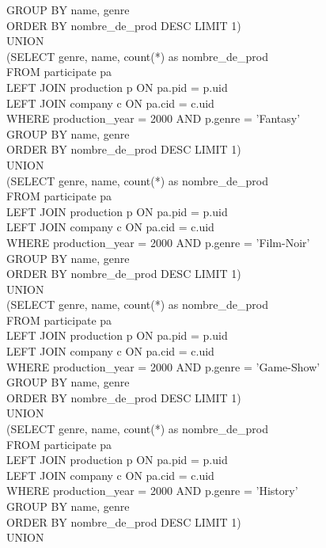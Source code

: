 \documentclass{article}
\begin{document}
GROUP BY name, genre\\
ORDER BY nombre_de_prod DESC LIMIT 1)\\
UNION\\
(SELECT genre, name, count(*) as nombre_de_prod\\
FROM participate pa\\
LEFT JOIN production p ON pa.pid = p.uid\\
LEFT JOIN company c ON pa.cid = c.uid\\
WHERE production_year = 2000 AND p.genre = 'Fantasy'  \\
GROUP BY name, genre\\
ORDER BY nombre_de_prod DESC LIMIT 1)\\
UNION \\
(SELECT genre, name, count(*) as nombre_de_prod\\
FROM participate pa\\
LEFT JOIN production p ON pa.pid = p.uid\\
LEFT JOIN company c ON pa.cid = c.uid\\
WHERE production_year = 2000 AND p.genre = 'Film-Noir'  \\
GROUP BY name, genre\\
ORDER BY nombre_de_prod DESC LIMIT 1)\\
UNION\\
(SELECT genre, name, count(*) as nombre_de_prod\\
FROM participate pa\\
LEFT JOIN production p ON pa.pid = p.uid\\
LEFT JOIN company c ON pa.cid = c.uid\\
WHERE production_year = 2000 AND p.genre = 'Game-Show'  \\
GROUP BY name, genre\\
ORDER BY nombre_de_prod DESC LIMIT 1)\\
UNION\\
(SELECT genre, name, count(*) as nombre_de_prod\\
FROM participate pa\\
LEFT JOIN production p ON pa.pid = p.uid\\
LEFT JOIN company c ON pa.cid = c.uid\\
WHERE production_year = 2000 AND p.genre = 'History'  \\
GROUP BY name, genre\\
ORDER BY nombre_de_prod DESC LIMIT 1)\\
UNION \\
\end{document}
